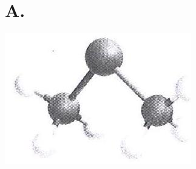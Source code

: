 \documentclass[10pt]{article}
\begin{document}
\section*{A.}
\begin{center}
\includegraphics[max width=\textwidth]{2025_10_23_ae7aef68fb3b41082d29g-33}
\end{center}
\end{document}
